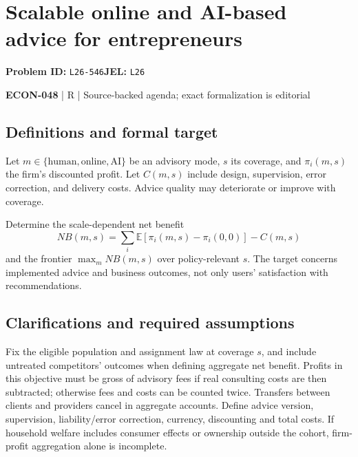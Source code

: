 \documentclass[11pt,a4paper]{article}
\begin{document}
\section*{Scalable online and AI-based advice for entrepreneurs}
\textbf{Problem ID:} \texttt{L26-546}\quad \textbf{JEL:} \texttt{L26}\par
\label{problem:OP-0618}


\label{audited:ECON-048}

{\sffamily\small\color{muted}\textbf{ECON-048} | R | Source-backed agenda; exact formalization is editorial\par}

\subsection*{Definitions and formal target}

Let $m\in\{\text{human},\text{online},\text{AI}\}$ be an advisory mode, $s$ its coverage, and $\pi_i(m,s)$ the firm's discounted profit. Let $C(m,s)$ include design, supervision, error correction, and delivery costs. Advice quality may deteriorate or improve with coverage.

Determine the scale-dependent net benefit
\[
 NB(m,s)=\sum_i\mathbb E[\pi_i(m,s)-\pi_i(0,0)]-C(m,s)
\]
and the frontier $\max_m NB(m,s)$ over policy-relevant $s$. The target concerns implemented advice and business outcomes, not only users' satisfaction with recommendations.

\subsection*{Clarifications and required assumptions}

Fix the eligible population and assignment law at coverage \(s\), and include untreated competitors' outcomes when defining aggregate net benefit. Profits in this objective must be gross of advisory fees if real consulting costs are then subtracted; otherwise fees and costs can be counted twice. Transfers between clients and providers cancel in aggregate accounts. Define advice version, supervision, liability/error correction, currency, discounting and total costs. If household welfare includes consumer effects or ownership outside the cohort, firm-profit aggregation alone is incomplete.
\end{document}
